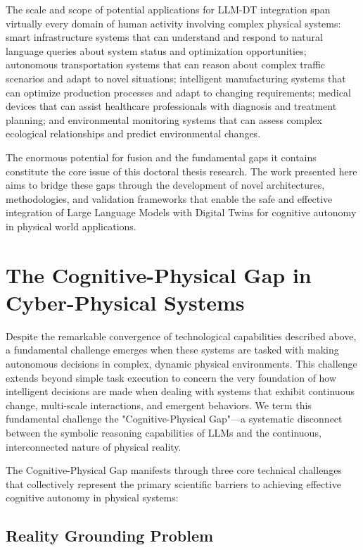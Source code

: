 The scale and scope of potential applications for LLM-DT integration span virtually every domain of human activity involving complex physical systems: smart infrastructure systems that can understand and respond to natural language queries about system status and optimization opportunities; autonomous transportation systems that can reason about complex traffic scenarios and adapt to novel situations; intelligent manufacturing systems that can optimize production processes and adapt to changing requirements; medical devices that can assist healthcare professionals with diagnosis and treatment planning; and environmental monitoring systems that can assess complex ecological relationships and predict environmental changes.

The enormous potential for fusion and the fundamental gaps it contains constitute the core issue of this doctoral thesis research. The work presented here aims to bridge these gaps through the development of novel architectures, methodologies, and validation frameworks that enable the safe and effective integration of Large Language Models with Digital Twins for cognitive autonomy in physical world applications.

\section{The Cognitive-Physical Gap in Cyber-Physical Systems}

Despite the remarkable convergence of technological capabilities described above, a fundamental challenge emerges when these systems are tasked with making autonomous decisions in complex, dynamic physical environments. This challenge extends beyond simple task execution to concern the very foundation of how intelligent decisions are made when dealing with systems that exhibit continuous change, multi-scale interactions, and emergent behaviors. We term this fundamental challenge the "Cognitive-Physical Gap"—a systematic disconnect between the symbolic reasoning capabilities of LLMs and the continuous, interconnected nature of physical reality.

The Cognitive-Physical Gap manifests through three core technical challenges that collectively represent the primary scientific barriers to achieving effective cognitive autonomy in physical systems:

\subsection{Reality Grounding Problem}


